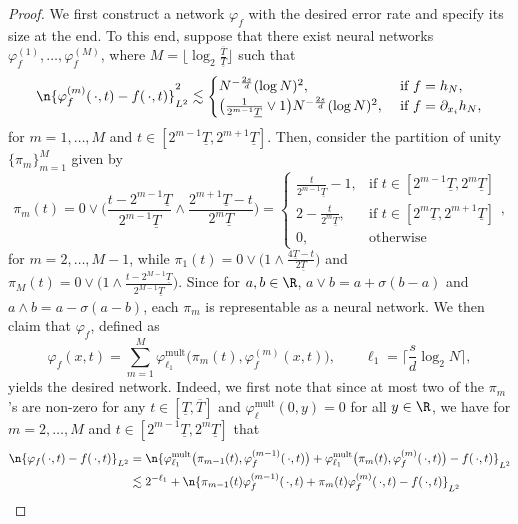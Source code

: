 \documentclass[a4paper, 11pt, headings = small, abstract]{scrartcl}
\begin{document}
\begin{proof}
	We first construct a network $\varphi_{f}$ with the desired error rate and specify its size at the end. To this end, suppose that there exist neural networks $\varphi_{f}^{(1)},\ldots,\varphi_{f}^{(M)}$, where $M=\lfloor\log_2\frac{\overline{T}}{\underline{T}}\rfloor$ such that
	\[
		\n{\varphi_{f}^{(m)}(\,\cdot,t)-f(\,\cdot,t)}_{L^2}^2\lesssim \begin{cases}
			N^{-\frac{2s}{d}}(\log N)^2, &\text{ if }f=h_N,\\
			\big(\frac{1}{2^{m-1}\underline{T}}\vee 1\big)N^{-\frac{2s}{d}}(\log N)^2, &\text{ if }f=\partial_{x_i}h_N,
		\end{cases}
	\]
	for $m=1,\ldots,M$ and $t\in[2^{m-1}\underline{T},2^{m+1}\underline{T}]$.
	Then, consider the partition of unity $\{\pi_m\}_{m=1}^{M}$ given by
	\[
		\pi_m(t)
		=0\vee\Big(\frac{t-2^{m-1}\underline{T}}{2^{m-1}\underline{T}}\wedge\frac{2^{m+1}\underline{T}-t}{2^{m}\underline{T}}\Big)
		=\begin{cases}
			\frac{t}{2^{m-1}\underline{T}}-1, &\text{if }t\in[2^{m-1}\underline{T}, 2^{m}\underline{T}]\\
			2-\frac{t}{2^m\underline{T}}, &\text{if }t\in[2^m\underline{T},2^{m+1}\underline{T}]\\
			0, &\text{otherwise}
		\end{cases},
	\]
	for $m=2,\ldots,M-1$, while $\pi_1(t)=0\vee\Big(1\wedge\frac{4\underline{T}-t}{2\underline{T}}\Big)$ and $\pi_{M}(t)=0\vee\Big(1\wedge\frac{t-2^{M-1}\underline{T}}{2^{M-1}\underline{T}}\Big)$.
	Since for $a, b\in\R$, $a\vee b=a+\sigma(b-a)$ and $a\wedge b=a-\sigma(a-b)$, each $\pi_m$ is representable as a neural network.
	We then claim that $\varphi_{f}$, defined as
	\[
		\varphi_{f}(x, t)
		=\sum_{m=1}^{M}\varphi_{\ell_1}^{\mathrm{mult}}\big(\pi_m(t),\varphi_{f}^{(m)}(x, t)\big),\qquad\ell_1=\Big\lceil\frac{s}{d}\log_2 N\Big\rceil,
	\]
	yields the desired network.
	Indeed, we first note that since at most two of the $\pi_m$'s are non-zero for any $t\in[\underline{T}, \overline{T}]$ and $\varphi_{\ell}^{\mathrm{mult}}(0, y)=0$ for all $y\in\R$, we have for $m=2,\ldots,M$ and $t\in[2^{m-1}\underline{T}, 2^{m}\underline{T}]$ that
	\begin{align*}
		\n{\varphi_{f}(\,\cdot,t)-f(\,\cdot,t)}_{L^2}
		&=\n{\varphi_{\ell_1}^{\mathrm{mult}}\big(\pi_{m-1}(t), \varphi_{f}^{(m-1)}(\,\cdot, t)\big)+\varphi_{\ell_1}^{\mathrm{mult}}\big(\pi_{m}(t), \varphi_{f}^{(m)}(\,\cdot, t)\big)-f(\,\cdot,t)}_{L^2} \\
		&\lesssim 2^{-\ell_1}+\n{\pi_{m-1}(t)\varphi_{f}^{(m-1)}(\,\cdot,t)+\pi_{m}(t)\varphi_{f}^{(m)}(\,\cdot,t)-f(\,\cdot,t)}_{L^2} \\

\end{align*}
\end{proof}
\end{document}
